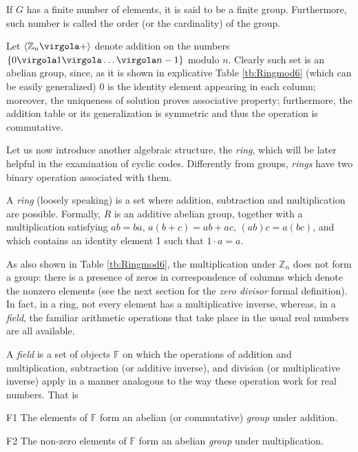 \begin{Def}
If $G$ has a finite number of elements, it is said to be a finite group. Furthermore, such number is called the order (or the cardinality) of the group.
\end{Def}

Let \( \langle \mathbb Z_n \virgola + \rangle \) denote addition on the numbers \( \{0 \virgola 1 \virgola \ldots \virgola n-1 \}\) modulo $n$. Clearly such set is an abelian group, since, as it is shown in explicative Table \ref{tb:Ringmod6} (which can be easily generalized) 0 is the identity element appearing in each column; moreover, the uniqueness of solution proves associative property; furthermore, the addition table or its generalization is symmetric and thus the operation is commutative.

Let us now introduce another algebraic structure, the \emph{ring}, which will be later helpful in the examination of cyclic codes. Differently from groups, \emph{rings} have two binary operation associated with them.
\begin{Def}
A \emph{ring} (loosely speaking) is a set where addition, subtraction and multiplication are possible. Formally, \(R\) is an additive abelian group, together with a multiplication satisfying \(ab=ba\), \(a(b+c)=ab+ac\), \((ab)c = a(bc)\), and which contains an identity element 1 such that \(1\cdot a=a\).
\end{Def}
As also shown in Table \ref{tb:Ringmod6}, the multiplication under \( \mathbb Z_{n}\) does not form a group: there is a presence of zeros in correspondence of columns which denote the nonzero elements (see the next section for the \emph{zero divisor} formal definition). In fact, in a ring, not every element has a multiplicative inverse, whereas, in a \emph{field}, the familiar arithmetic operations that take place in the usual real numbers are all available.

\begin{Def}
A \emph{field} is a set of objects \( \mathbb F\) on which the operations of addition and multiplication, subtraction (or additive inverse), and division (or multiplicative inverse) apply in a manner analogous to the way these operation work for real numbers. That is
\itemize
\item[F1]  The elements of \( \mathbb F \) form an abelian (or commutative) \emph{group} under addition.
\item[F2] The non-zero elements of \( \mathbb F\) form an abelian \emph{group} under multiplication.
\end{Def}

